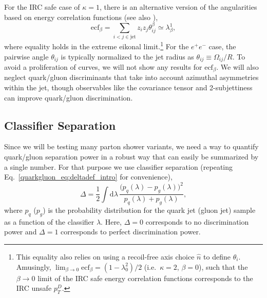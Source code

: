 \documentclass[11pt]{cernrep}
\begin{document}
For the IRC safe case of $\kappa = 1$, there is an alternative version
of the angularities based on energy correlation functions \cite{Larkoski:2013eya} (see also \cite{Banfi:2004yd,Jankowiak:2011qa}),
\begin{equation}
\text{ecf}_\beta = \sum_{i < j \in \text{jet}} z_i z_j \theta_{ij}^\beta \simeq \lambda^{1}_{\beta},
\end{equation}
where equality holds in the extreme eikonal limit.\footnote{This equality also relies on using a recoil-free axis choice $\hat{n}$ to define $\theta_i$.  Amusingly, $\lim_{\beta \to 0} \text{ecf}_\beta = (1 - \lambda^{2}_{0})/2$ (i.e.~$\kappa = 2$, $\beta = 0$), such that the $\beta \to 0$ limit of the IRC safe energy correlation functions corresponds to the IRC unsafe $p_T^D$.}  For the $e^+ e^-$ case, the pairwise angle $\theta_{ij}$ is typically normalized to the jet radius as $\theta_{ij} \equiv \Omega_{ij}/R$.   To avoid a proliferation of curves, we will not show any results for $\text{ecf}_\beta$.  We will also neglect quark/gluon discriminants that take into account azimuthal asymmetries within the jet, though observables like the covariance tensor \cite{Gallicchio:2012ez} and 2-subjettiness \cite{Thaler:2010tr,Thaler:2011gf} can improve quark/gluon discrimination.

\subsection{Classifier Separation}
\label{quarkgluon_sec:classsep}

Since we will be testing many parton shower variants, we need a way to quantify quark/gluon separation power in a robust way that can easily be summarized by a single number.  For that purpose we use classifier separation  (repeating Eq.~\eqref{quarkgluon_eq:deltadef_intro} for convenience),
\begin{equation}
\label{quarkgluon_eq:deltadef}
\Delta =  \frac{1}{2} \int \text{d} \lambda \, \frac{\bigl(p_q(\lambda) - p_g(\lambda)\bigr)^2}{p_q(\lambda) + p_g(\lambda)},
\end{equation}
where $p_q$ ($p_g$) is the probability distribution for the quark jet (gluon jet) sample as a function of the classifier $\lambda$.  Here, $\Delta = 0$ corresponds to no discrimination power and $\Delta = 1$ corresponds to perfect discrimination power.
\end{document}
